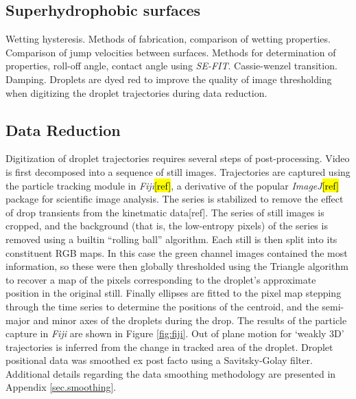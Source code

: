 \documentclass[a4paper, 12pt]{article}
\begin{document}
\subsection{Superhydrophobic surfaces} \label{sec.suphydro}
Wetting hysteresis. Methods of fabrication, comparison of wetting properties. Comparison of jump velocities between surfaces. Methods for determination of properties, roll-off angle, contact angle using \emph{SE-FIT}. Cassie-wenzel transition. Damping. Droplets are dyed red to improve the quality of image thresholding when digitizing the droplet trajectories during data reduction.



\subsection{Data Reduction}
Digitization of droplet trajectories requires several steps of post-processing. Video is first decomposed into a sequence of still images. Trajectories are captured using the particle tracking module in \emph{Fiji}\hl{[ref]}, a derivative of the popular \emph{ImageJ}\hl{[ref]} package for scientific image analysis. The series is stabilized to remove the effect of drop transients from the kinetmatic data[ref]. The series of still images is cropped, and the background (that is, the low-entropy pixels) of the series is removed using a builtin ``rolling ball'' algorithm. Each still is then split into its constituent RGB maps. In this case the green channel images contained the most information, so these were then globally thresholded using the Triangle algorithm to recover a map of the pixels corresponding to the droplet's approximate position in the original still. Finally ellipses are fitted to the pixel map stepping through the time series to determine the positions of the centroid, and the semi-major and minor axes of the droplets during the drop. The results of the particle capture in \emph{Fiji} are shown in Figure \ref{fig:fiji}. Out of plane motion for `weakly 3D' trajectories is inferred from the change in tracked area of the droplet. Droplet positional data was smoothed ex post facto using a Savitsky-Golay filter. Additional details regarding the data smoothing methodology are presented in Appendix \ref{sec.smoothing}.
\end{document}
